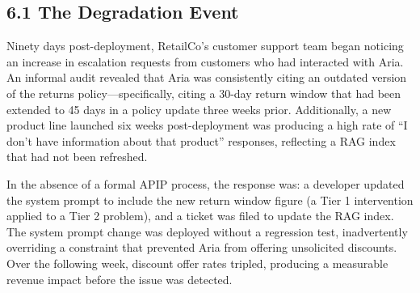 \subsection{6.1  The Degradation Event}

Ninety days post-deployment, RetailCo's customer support team began noticing an increase in escalation requests from customers who had interacted with Aria. An informal audit revealed that Aria was consistently citing an outdated version of the returns policy---specifically, citing a 30-day return window that had been extended to 45 days in a policy update three weeks prior. Additionally, a new product line launched six weeks post-deployment was producing a high rate of ``I don't have information about that product'' responses, reflecting a RAG index that had not been refreshed.

In the absence of a formal APIP process, the response was: a developer updated the system prompt to include the new return window figure (a Tier 1 intervention applied to a Tier 2 problem), and a ticket was filed to update the RAG index. The system prompt change was deployed without a regression test, inadvertently overriding a constraint that prevented Aria from offering unsolicited discounts. Over the following week, discount offer rates tripled, producing a measurable revenue impact before the issue was detected.

